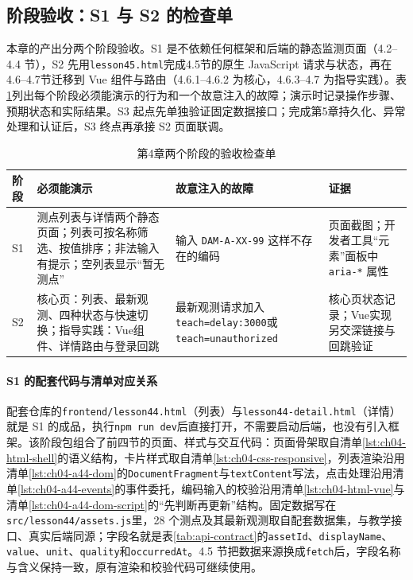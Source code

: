 \subsection{阶段验收：S1 与 S2 的检查单}

本章的产出分两个阶段验收。S1 是不依赖任何框架和后端的静态监测页面（4.2–4.4 节），S2 先用\texttt{lesson45.html}完成4.5节的原生 JavaScript 请求与状态，再在4.6–4.7节迁移到 Vue 组件与路由（4.6.1–4.6.2 为核心，4.6.3–4.7 为指导实践）。表\ref{tab:ch04-stage-acceptance}列出每个阶段必须能演示的行为和一个故意注入的故障；演示时记录操作步骤、预期状态和实际结果。S3 起点先单独验证固定数据接口；完成第5章持久化、异常处理和认证后，S3 终点再承接 S2 页面联调。

\begin{table}[htbp]
\centering
\caption{第4章两个阶段的验收检查单}
\label{tab:ch04-stage-acceptance}
\begin{tabular}{p{1.2cm}p{5.4cm}p{3.6cm}p{3.2cm}}
\toprule
阶段 & 必须能演示 & 故意注入的故障 & 证据 \\
\midrule
S1 & 测点列表与详情两个静态页面；列表可按名称筛选、按值排序；非法输入有提示；空列表显示“暂无测点” & 输入 \texttt{DAM-A-XX-99} 这样不存在的编码 & 页面截图；开发者工具“元素”面板中 \texttt{aria-*} 属性 \\
S2 & 核心页：列表、最新观测、四种状态与快速切换；指导实践：Vue组件、详情路由与登录回跳 & 最新观测请求加入\texttt{teach=delay:3000}或\texttt{teach=unauthorized} & 核心页状态记录；Vue实现另交深链接与回跳验证 \\
\bottomrule
\end{tabular}
\end{table}

\paragraph{S1 的配套代码与清单对应关系}配套仓库的\texttt{frontend/lesson44.html}（列表）与\texttt{lesson44-detail.html}（详情）就是 S1 的成品，执行\texttt{npm run dev}后直接打开，不需要启动后端，也没有引入框架。该阶段包组合了前四节的页面、样式与交互代码：页面骨架取自清单\ref{lst:ch04-html-shell}的语义结构，卡片样式取自清单\ref{lst:ch04-css-responsive}，列表渲染沿用清单\ref{lst:ch04-a44-dom}的\texttt{DocumentFragment}与\texttt{textContent}写法，点击处理沿用清单\ref{lst:ch04-a44-events}的事件委托，编码输入的校验沿用清单\ref{lst:ch04-html-vue}与清单\ref{lst:ch04-a44-dom-script}的“先判断再更新”结构。固定数据写在\texttt{src/lesson44/assets.js}里，28 个测点及其最新观测取自配套数据集，与教学接口、真实后端同源；字段名就是表\ref{tab:api-contract}的\texttt{assetId}、\texttt{displayName}、\texttt{value}、\texttt{unit}、\texttt{quality}和\texttt{occurredAt}。4.5 节把数据来源换成\texttt{fetch}后，字段名称与含义保持一致，原有渲染和校验代码可继续使用。

